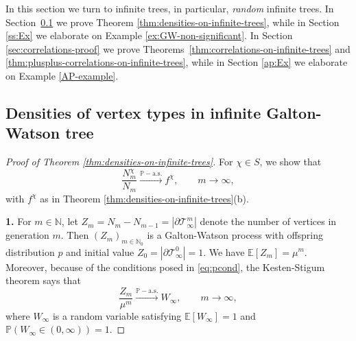 \documentclass[11pt]{article}
\numberwithin{equation}{section}
\theoremstyle{plain}
\newcommand{\N}{\mathbb N}
\newcommand{\EE}{\mathbb E}
\newcommand{\PP}{\mathbb{P}}
\newcommand{\Tt}{\mathcal{T}}
\begin{document}
In this section we turn to infinite trees, in particular, \emph{random} infinite trees. In Section~\ref{ss:infGW} we prove Theorem \ref{thm:densities-on-infinite-trees}, while in Section \ref{ss:Ex} we elaborate on Example \ref{ex:GW-non-significant}. In Section \ref{sec:correlations-proof} we prove Theorems~\ref{thm:correlations-on-infinite-trees} and \ref{thm:plusplus-correlations-on-infinite-trees}, while in Section \ref{ap:Ex} we elaborate on Example \ref{AP-example}.


\subsection{Densities of vertex types in infinite Galton-Watson tree}
\label{ss:infGW}


\begin{proof}[Proof of Theorem \ref{thm:densities-on-infinite-trees}]
For $\chi \in S$, we show that
\begin{equation}
\label{eq:limit-tree}
\frac{N^{\chi}_m}{N_m} \stackrel{\PP-\mathrm{a.s.}}{\longrightarrow} f^\chi, \qquad m\to\infty,
\end{equation}
with $f^\chi$ as in Theorem \ref{thm:densities-on-infinite-trees}(b).

\medskip\noindent
{\bf 1.}
For $m \in \N$, let $Z_m = N_m-N_{m-1} = |\partial \Tt_\infty^m|$ denote the number of vertices in generation $m$. Then $(Z_m)_{m \in \N_0}$ is a Galton-Watson process with offspring distribution $p$ and initial value $Z_0=|\partial \Tt_{\infty}^0|=1$. We have $\EE[Z_m] = \mu^m$. Moreover, because of the conditions posed in \eqref{eq:pcond}, the Kesten-Stigum theorem \cite{KS} says that 
\begin{equation}
\label{eq:KSthm*}
\frac{Z_m}{\mu^m} \stackrel{\PP-\mathrm{a.s.}}{\longrightarrow} W_\infty, \qquad m\to\infty,
\end{equation}
where $W_\infty$ is a random variable satisfying $\EE[W_\infty]=1$ and $\PP(W_\infty \in (0,\infty))=1$.


\end{proof}
\end{document}
